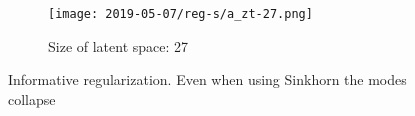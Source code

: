 \begin{figure}[!htbp]
   \centering
\begin{subfigure}[t]{0.48\textwidth}
   \texttt{[image: 2019-05-07/reg-s/a\_zt-27.png]}
   \caption{Size of latent space: 27}
   \label{fig:2019-05-07_reg-s-a}
\end{subfigure}
   \caption{Informative regularization. Even when using Sinkhorn the modes collapse}
   \label{fig:2019-05-07_reg-s}
\end{figure}